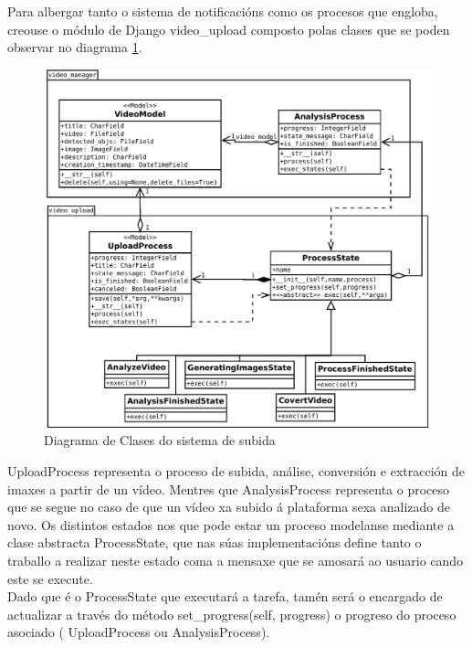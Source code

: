         Para albergar tanto o sistema de notificacións como os procesos que engloba, creouse o módulo de 
        Django video\_upload composto polas clases que se poden observar no diagrama \ref{fig:ClassDiagram}.

        \begin{figure}[htp]
        \begin{center}
            \includegraphics[scale=0.4]{figures/ClassDiagram.pdf}
            \caption{Diagrama de Clases do sistema de subida}
        \label{fig:ClassDiagram}
        \end{center}
        \end{figure}
        
        UploadProcess representa o proceso de subida, análise, conversión e extracción de imaxes
        a partir de un vídeo. Mentres que AnalysisProcess representa o proceso que se segue no 
        caso de que un vídeo xa subido á plataforma sexa analizado de novo. Os distintos estados
        nos que pode estar un proceso modelanse mediante a clase abstracta ProcessState, que nas
        súas implementacións define tanto o traballo a realizar neste estado coma a mensaxe que 
        se amosará ao usuario cando este se execute.\\
        
        Dado que é o ProcessState que executará a tarefa, tamén será o encargado de actualizar
        a través do método set\_progress(self, progress) o progreso do proceso asociado (
        UploadProcess ou AnalysisProcess).\\
        
